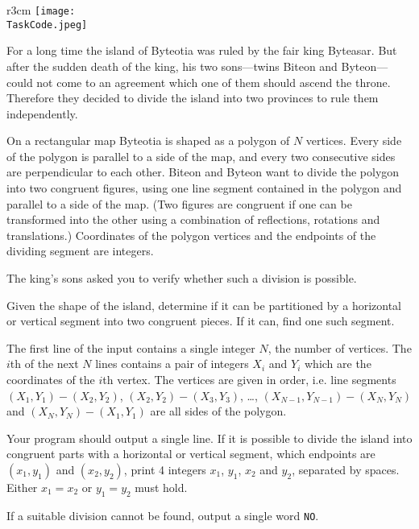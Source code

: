 \documentclass{boi2014}
\renewcommand{\TaskCode}{demarcation}
\newcommand{\constant}[1]{{\tt #1}}
\begin{document}
    \begin{wrapfigure}{r}{3cm}
        \vspace{-24pt}
        \texttt{[image: \\TaskCode.jpeg]}
    \end{wrapfigure}

    For a long time the island of Byteotia was ruled by the fair king
    Byteasar. But after the sudden death
    of the king, his two sons---twins Biteon and Byteon---could
    not come to an agreement which one of them should ascend the throne.
    Therefore they decided to divide the island into two provinces to
    rule them independently.  
 
    On a rectangular map Byteotia is shaped as a polygon of $N$ vertices. Every
    side of the polygon is parallel to a side of the map, and every two
    consecutive sides are perpendicular to each other.  Biteon and Byteon want
    to divide the polygon into two congruent figures, using one line segment
    contained in the polygon and parallel to a side of the map.  (Two figures
    are congruent if one can be transformed into the other using a combination
    of reflections, rotations and translations.) Coordinates of the polygon
    vertices and the endpoints of the dividing segment are integers.  
 
    The king's sons asked you to verify whether such a division is
    possible.

    \Task
    Given the shape of the island, determine if it can be partitioned
    by a horizontal or vertical segment into two congruent pieces. If
    it can, find one such segment.
    
    \Input
    The first line of the input contains a single integer $N$, the number of
    vertices. The $i$th of the next $N$ lines contains a pair of integers $X_i$
    and $Y_i$ which are the coordinates of the $i$th vertex.
    The vertices are given in order, i.e. line segments $(X_1,Y_1) - (X_2,Y_2)$,
    $(X_2,Y_2) - (X_3,Y_3)$, \ldots, $(X_{N-1},Y_{N-1}) - (X_N,Y_N)$ and
    $(X_N,Y_N) - (X_1,Y_1)$ are all sides of the polygon.


    \Output
    Your program should output a single line. If it is possible to divide the
    island into congruent parts with a horizontal or vertical segment, which
    endpoints are $(x_1, y_1)$ and $(x_2, y_2)$, print 4 integers $x_1$,
    $y_1$, $x_2$ and $y_2$, separated by spaces.
    Either $x_1 = x_2$ or $y_1 = y_2$ must hold.

    If a suitable division cannot be found, output a single word \constant{NO}.
\end{document}
